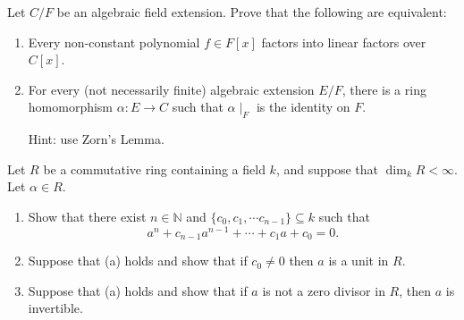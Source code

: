 \begin{problem}
\label{prob:1.1}
Let $C/F$ be an algebraic field extension. Prove that the following are equivalent:
\begin{enumerate}
    \item Every non-constant polynomial $f\in F[x]$ factors into linear factors over $C[x]$.
    \item For every (not necessarily finite) algebraic extension $E/F$, there is a ring homomorphism $\alpha: E \to C$ such that $\alpha \mid_F$ is the identity on $F$.
    
    Hint: use Zorn's Lemma.
\end{enumerate}
\end{problem}

\begin{problem}
\label{prob:1.1}
Let $R$ be a commutative ring containing a field $k$, and suppose that $\dim_k R < \infty$. Let $\alpha \in R$.
\begin{enumerate}
    \item Show that there exist $n\in \mathbb N$ and $\{ c_0, c_1, \cdots c_{n-1}\} \subseteq k$ such that
    $$
    a^n + c_{n-1}a^{n-1} + \cdots + c_1 a + c_0 = 0.
    $$
    \item Suppose that (a) holds and show that if $c_0 \neq 0$ then $a$ is a unit in $R$.
    \item Suppose that (a) holds and show that if $a$ is not a zero divisor in $R$, then $a$ is invertible.
\end{enumerate}
\end{problem}